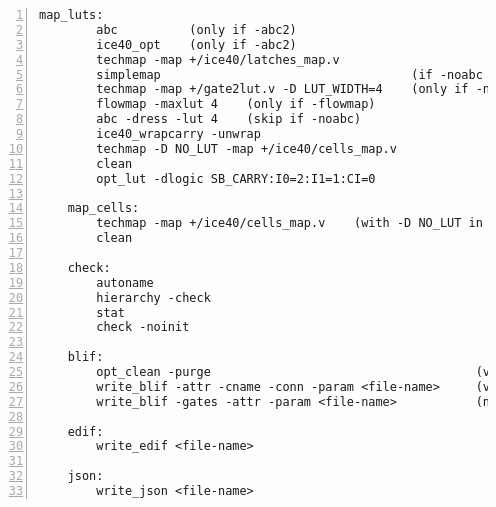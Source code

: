 \begin{lstlisting}[numbers=left,frame=single]
    map_luts:
        abc          (only if -abc2)
        ice40_opt    (only if -abc2)
        techmap -map +/ice40/latches_map.v
        simplemap                                   (if -noabc or -flowmap)
        techmap -map +/gate2lut.v -D LUT_WIDTH=4    (only if -noabc)
        flowmap -maxlut 4    (only if -flowmap)
        abc -dress -lut 4    (skip if -noabc)
        ice40_wrapcarry -unwrap
        techmap -D NO_LUT -map +/ice40/cells_map.v
        clean
        opt_lut -dlogic SB_CARRY:I0=2:I1=1:CI=0

    map_cells:
        techmap -map +/ice40/cells_map.v    (with -D NO_LUT in vpr mode)
        clean

    check:
        autoname
        hierarchy -check
        stat
        check -noinit

    blif:
        opt_clean -purge                                     (vpr mode)
        write_blif -attr -cname -conn -param <file-name>     (vpr mode)
        write_blif -gates -attr -param <file-name>           (non-vpr mode)

    edif:
        write_edif <file-name>

    json:
        write_json <file-name>
\end{lstlisting}


